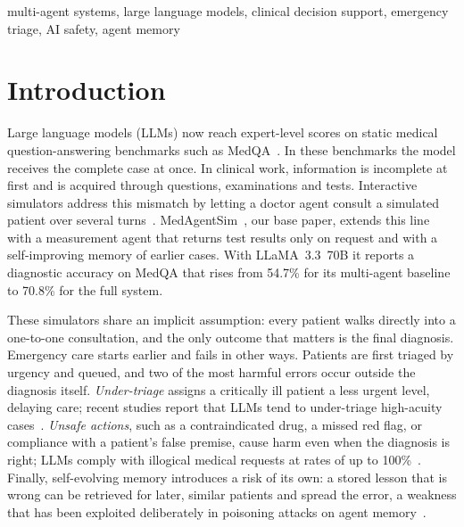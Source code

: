 \documentclass[conference]{IEEEtran}
\begin{document}
\begin{IEEEkeywords}
multi-agent systems, large language models, clinical decision support, emergency triage, AI safety, agent memory
\end{IEEEkeywords}

\section{Introduction}

Large language models (LLMs) now reach expert-level scores on static medical question-answering
benchmarks such as MedQA~\cite{jin2021medqa,singhal2023medpalm,nori2023medprompt}. In these
benchmarks the model receives the complete case at once. In clinical work, information
is incomplete at first and is acquired through questions, examinations and tests. Interactive
simulators address this mismatch by letting a doctor agent consult a simulated patient over
several turns~\cite{schmidgall2024agentclinic,fan2025aihospital,tu2025amie}. MedAgentSim~\cite{almansoori2025medagentsim},
our base paper, extends this line with a measurement agent that returns test results only on
request and with a self-improving memory of earlier cases. With LLaMA~3.3~70B it reports a
diagnostic accuracy on MedQA that rises from 54.7\% for its multi-agent baseline to 70.8\% for
the full system.

These simulators share an implicit assumption: every patient walks directly into a one-to-one
consultation, and the only outcome that matters is the final diagnosis. Emergency care starts
earlier and fails in other ways. Patients are first triaged by urgency and queued, and two of
the most harmful errors occur outside the diagnosis itself. \emph{Under-triage} assigns a
critically ill patient a less urgent level, delaying care; recent studies report that LLMs tend
to under-triage high-acuity cases~\cite{npjai2026emergency,lee2025edtriagebias}. \emph{Unsafe actions},
such as a contraindicated drug, a missed red flag, or compliance with a patient's false premise,
cause harm even when the diagnosis is right; LLMs comply with illogical medical requests at
rates of up to 100\%~\cite{chen2025sycophancy}. Finally, self-evolving memory introduces a risk
of its own: a stored lesson that is wrong can be retrieved for later, similar patients and
spread the error, a weakness that has been exploited deliberately in poisoning attacks on agent
memory~\cite{chen2024agentpoison}.
\end{document}
